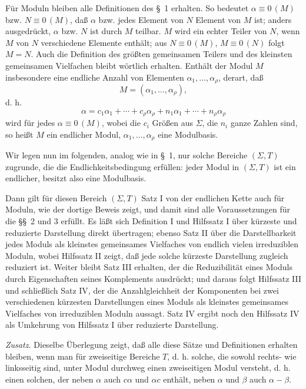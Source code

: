 \documentclass[11pt]{article}
\newcommand{\eqzero}[1]{\equiv 0\,(#1)}
\begin{document}
Für Moduln bleiben alle Definitionen des \S~1 erhalten. So bedeutet $\alpha\eqzero{M}$ bzw. $N\eqzero{M}$, daß $\alpha$ bzw. jedes Element von $N$ Element von $M$ ist; anders ausgedrückt, $\alpha$ bzw. $N$ ist durch $M$ teilbar. $M$ wird ein echter Teiler von $N$, wenn $M$ von $N$ verschiedene Elemente enthält; aus $N\eqzero{M}$, $M\eqzero{N}$ folgt $M=N$. Auch die Definition des größten gemeinsamen Teilers und des kleinsten gemeinsamen Vielfachen bleibt wörtlich erhalten. Enthält der Modul $M$ insbesondere eine endliche Anzahl von Elementen $\alpha_1,\ldots,\alpha_\rho$, derart, daß
\[
 M=(\alpha_1,
\ldots,\alpha_\rho),
\]
d. h.
\[
 \alpha=c_1\alpha_1+\cdots+c_\rho\alpha_\rho
       +n_1\alpha_1+\cdots+n_\rho\alpha_\rho
\]
wird für jedes $\alpha\eqzero{M}$, wobei die $c_i$ Größen aus $\Sigma$, die $n_i$ ganze Zahlen sind, so heißt $M$ ein endlicher Modul, $\alpha_1,\ldots,\alpha_\rho$ eine Modulbasis.

Wir legen nun im folgenden, analog wie in \S~1, nur solche Bereiche $(\Sigma,T)$ zugrunde, die die Endlichkeitsbedingung erfüllen: jeder Modul in $(\Sigma,T)$ ist ein endlicher, besitzt also eine Modulbasis.

Dann gilt für diesen Bereich $(\Sigma,T)$ Satz I von der endlichen Kette auch für Moduln, wie der dortige Beweis zeigt, und damit sind alle Voraussetzungen für die \S\S~2 und 3 erfüllt. Es läßt sich Definition I und Hilfssatz I über kürzeste und reduzierte Darstellung direkt übertragen; ebenso Satz II über die Darstellbarkeit jedes Moduls als kleinstes gemeinsames Vielfaches von endlich vielen irreduziblen Moduln, wobei Hilfssatz II zeigt, daß jede solche kürzeste Darstellung zugleich reduziert ist. Weiter bleibt Satz III erhalten, der die Reduzibilität eines Moduls durch Eigenschaften seines Komplements ausdrückt; und daraus folgt Hilfssatz III und schließlich Satz IV, der die Anzahlgleichheit der Komponenten bei zwei verschiedenen kürzesten Darstellungen eines Moduls als kleinstes gemeinsames Vielfaches von irreduziblen Moduln aussagt. Satz IV ergibt noch den Hilfssatz IV als Umkehrung von Hilfssatz I über reduzierte Darstellung.

\emph{Zusatz.} Dieselbe Überlegung zeigt, daß alle diese Sätze und Definitionen erhalten bleiben, wenn man für zweiseitige Bereiche $T$, d. h. solche, die sowohl rechts- wie linksseitig sind, unter Modul durchweg einen zweiseitigen Modul versteht, d. h. einen solchen, der neben $\alpha$ auch $c\alpha$ und $\alpha c$ enthält, neben $\alpha$ und $\beta$ auch $\alpha-\beta$.
\end{document}
